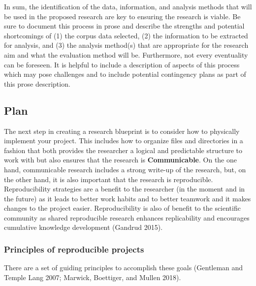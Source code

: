 \documentclass[
  letterpaper,
]{latex/krantz}
\begin{document}
In sum, the identification of the data, information, and analysis
methods that will be used in the proposed research are key to ensuring
the research is viable. Be sure to document this process in prose and
describe the strengths and potential shortcomings of (1) the corpus data
selected, (2) the information to be extracted for analysis, and (3) the
analysis method(s) that are appropriate for the research aim and what
the evaluation method will be. Furthermore, not every eventuality can be
foreseen. It is helpful to include a description of aspects of this
process which may pose challenges and to include potential contingency
plans as part of this prose description.

\hypertarget{fr-plan}{%
\subsection{Plan}\label{fr-plan}}

The next step in creating a research blueprint is to consider how to
physically implement your project. This includes how to organize files
and directories in a fashion that both provides the researcher a logical
and predictable structure to work with but also ensures that the
research is \textbf{Communicable}. On the one hand, communicable
research includes a strong write-up of the research, but, on the other
hand, it is also important that the research is reproducible.
Reproducibility strategies are a benefit to the researcher (in the
moment and in the future) as it leads to better work habits and to
better teamwork and it makes changes to the project easier.
Reproducibility is also of benefit to the scientific community as shared
reproducible research enhances replicability and encourages cumulative
knowledge development (Gandrud 2015).

\hypertarget{fr-principles-reproducible-projects}{%
\subsubsection{Principles of reproducible
projects}\label{fr-principles-reproducible-projects}}

There are a set of guiding principles to accomplish these goals
(Gentleman and Temple Lang 2007; Marwick, Boettiger, and Mullen 2018).
\end{document}
